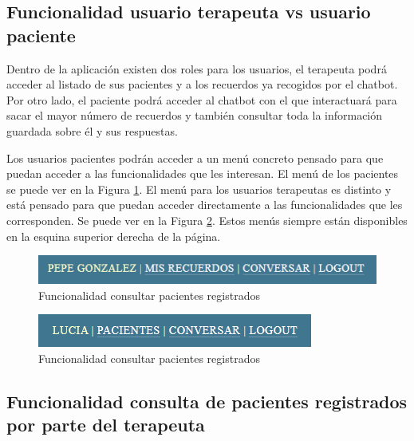 \subsection{Funcionalidad usuario terapeuta vs usuario paciente}

Dentro de la aplicación existen dos roles para los usuarios, el terapeuta podrá acceder al listado de sus pacientes y a los recuerdos ya recogidos por el chatbot. Por otro lado, el paciente podrá acceder al chatbot con el que interactuará para sacar el mayor número de recuerdos y también consultar toda la información guardada sobre él y sus respuestas.

Los usuarios pacientes podrán acceder a un menú concreto pensado para que puedan acceder a las funcionalidades que les interesan. El menú de los pacientes se puede ver en la Figura \ref{fig:funcionalidad_terapeutavspaciente2}. El menú para los usuarios terapeutas es distinto y está pensado para que puedan acceder directamente a las funcionalidades que les corresponden. Se puede ver en la Figura \ref{fig:funcionalidadterapeutavspacientes}. Estos menús siempre están disponibles en la esquina superior derecha de la página.

\begin{figure}[h]
	\centering
	\includegraphics[scale=1.0]{Imagenes/Vectorial/funcionalidad_terapeutavspaciente2}
	\caption{Funcionalidad consultar pacientes registrados}
	\label{fig:funcionalidad_terapeutavspaciente2}
\end{figure}

\begin{figure}[h]
	\centering
	\includegraphics[scale=1.0]{Imagenes/Vectorial/funcionalidad_terapeutavspaciente}
	\caption{Funcionalidad consultar pacientes registrados}
	\label{fig:funcionalidadterapeutavspacientes}
\end{figure}

\subsection{Funcionalidad consulta de pacientes registrados por parte del terapeuta}

